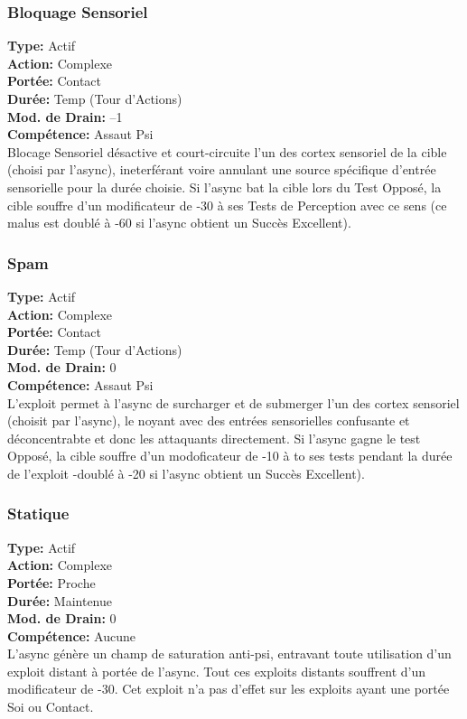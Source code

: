 \subsubsection{Bloquage Sensoriel} \textbf{Type:} Actif \\ \textbf{Action:} Complexe \\ \textbf{Portée:} Contact \\ \textbf{Durée:} Temp (Tour d'Actions) \\ \textbf{Mod. de Drain:} –1 \\ \textbf{Compétence:} Assaut Psi \\ Blocage Sensoriel désactive et court-circuite l'un des cortex sensoriel de la cible (choisi par l'async), ineterférant voire annulant une source spécifique d'entrée sensorielle pour la durée choisie. Si l'async bat la cible lors du Test Opposé, la cible souffre d'un modificateur de -30 à ses Tests de Perception avec ce sens (ce malus est doublé à -60 si l'async obtient un Succès Excellent). 



\subsubsection{Spam} \textbf{Type:} Actif \\ \textbf{Action:} Complexe \\ \textbf{Portée:} Contact \\ \textbf{Durée:} Temp (Tour d'Actions) \\ \textbf{Mod. de Drain:} 0 \\ \textbf{Compétence:} Assaut Psi \\ L'exploit permet à l'async de surcharger et de submerger l'un des cortex sensoriel (choisit par l'async), le noyant avec des entrées sensorielles confusante et déconcentrabte et donc les attaquants directement. Si l'async gagne le test Opposé, la cible souffre d'un modoficateur de -10 à to ses tests pendant la durée de l'exploit -doublé à -20 si l'async obtient un Succès Excellent). 

\subsubsection{Statique} \textbf{Type:} Actif \\ \textbf{Action:} Complexe \\ \textbf{Portée:} Proche \\ \textbf{Durée:} Maintenue \\ \textbf{Mod. de Drain:} 0 \\ \textbf{Compétence:} Aucune\\ L'async génère un champ de saturation anti-psi, entravant toute utilisation d'un exploit distant à portée de l'async. Tout ces exploits distants souffrent d'un modificateur de -30. Cet exploit n'a pas d'effet sur les exploits ayant une portée Soi ou Contact. 

